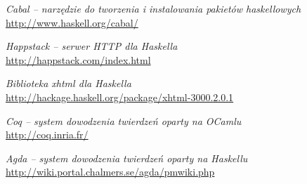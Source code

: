\documentclass[10pt,leqno]{article}
\begin{document}
\begin{thebibliography}{9}
  \emph{Cabal -- narzędzie do tworzenia i instalowania pakietów haskellowych} \\
  \url{http://www.haskell.org/cabal/}

  \emph{Happstack -- serwer HTTP dla Haskella} \\
  \url{http://happstack.com/index.html}

  \emph{Biblioteka xhtml dla Haskella} \\
  \url{http://hackage.haskell.org/package/xhtml-3000.2.0.1}

  \emph{Coq -- system dowodzenia twierdzeń oparty na OCamlu} \\
  \url{http://coq.inria.fr/}

  \emph{Agda -- system dowodzenia twierdzeń oparty na Haskellu} \\
  \url{http://wiki.portal.chalmers.se/agda/pmwiki.php}

\end{thebibliography}
\end{document}
